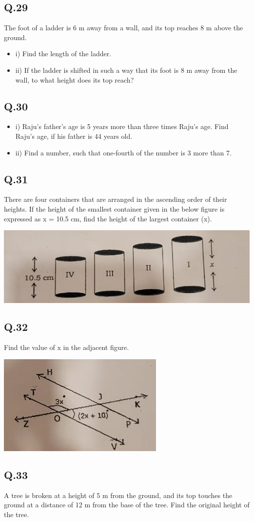 \documentclass[11pt]{article}
\begin{document}
\subsection*{Q.29}
\label{sec:org6342a23}
The foot of a ladder is 6 m away from a wall, and its top reaches 8 m above the ground.
\begin{itemize}
\item i) Find the length of the ladder.
\item ii) If the ladder is shifted in such a way that its foot is 8 m away from the wall, to what height does its top reach?
\end{itemize}
\subsection*{Q.30}
\label{sec:org16a5e22}
\begin{itemize}
\item i) Raju's father's age is 5 years more than three times Raju's age. Find Raju's age, if his father is 44 years old.
\item ii) Find a number, such that one-fourth of the number is 3 more than 7.
\end{itemize}
\subsection*{Q.31}
\label{sec:org3f121e2}
There are four containers that are arranged in the ascending order of their heights. If the height of the smallest container given in the below figure is expressed as x = 10.5 cm, find the height of the largest container (x).
\begin{center}
\includegraphics[width=.9\linewidth]{./maths31.png}
\end{center}
\subsection*{Q.32}
\label{sec:orgb578b96}
Find the value of x in the adjacent figure.
\begin{center}
\includegraphics[width=.9\linewidth]{./maths32.png}
\end{center}
\subsection*{Q.33}
\label{sec:org9d72099}
A tree is broken at a height of 5 m from the ground, and its top touches the ground at a distance of 12 m from the base of the tree. Find the original height of the tree.
\end{document}
